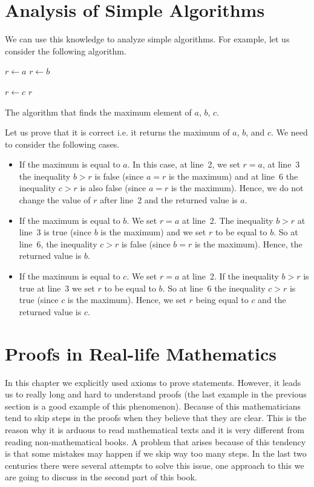 \section{Analysis of Simple Algorithms}
\label{section:simple-algorithm}
We can use this knowledge to analyze simple algorithms. For example, let us
consider the following algorithm.
\begin{algorithm}
  \begin{algorithmic}[1]
      \State $r \gets a$
        \State $r \gets b$
      \EndIf

        \State $r \gets c$
      \EndIf
      \State \Return $r$
    \EndFunction
  \end{algorithmic}
  \caption{The algorithm that finds the maximum element of $a$, $b$, $c$.}
\end{algorithm}
Let us prove that it is correct i.e. it returns the maximum of $a$, $b$, and
$c$. We need to consider
the following cases.
\begin{itemize}
  \item If the maximum is equal to $a$. In this case, at line~2, we set $r = a$,
    at line~3 the inequality $b > r$ is false (since $a = r$ is the maximum) and
    at line~6 the inequality $c > r$ is also false (since $a = r$ is the
    maximum). Hence, we do not change the value of $r$ after line~2 and
    the returned value is $a$.
  \item If the maximum is equal to $b$. We set $r = a$ at line~2.
    The inequality $b > r$ at line~3 is true (since $b$ is the maximum) and
    we set $r$ to be equal to $b$.
    So at line~6, the inequality $c > r$ is false (since $b = r$ is the
    maximum). Hence, the returned value is $b$.
  \item If the maximum is equal to $c$. We set $r = a$ at line~2.
    If the inequality $b > r$ is true at line~3 we set $r$ to be equal to $b$.
    So at line~6 the inequality $c > r$ is true (since $c$ is the
    maximum). Hence, we set $r$ being equal to $c$ and the returned value is
    $c$.
\end{itemize}

\section{Proofs in Real-life Mathematics}
In this chapter we explicitly used axioms to prove statements. However, it
leads us to really long and hard to understand proofs (the last example in the
previous section is a good example of this phenomenon). Because of this
mathematicians tend to skip steps in the proofs when they believe that they are
clear. This is the reason why it is arduous to read mathematical texts and it
is very different from reading non-mathematical books. A problem that arises
because of this tendency is that some mistakes may happen if we skip way too
many steps. In the last two centuries there were several attempts to solve this
issue, one approach to this we are going to discuss in the second part of this
book.

